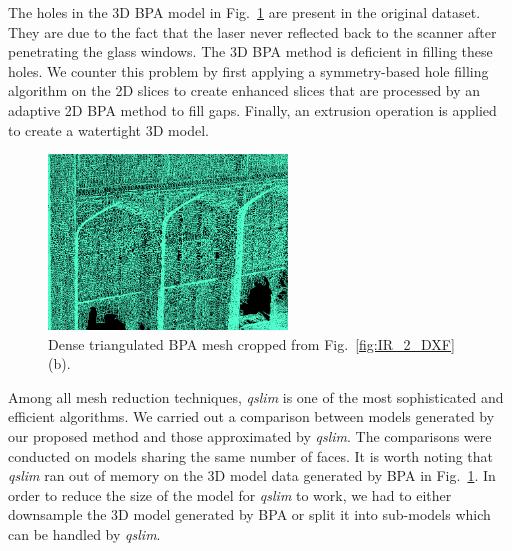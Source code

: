 \documentclass[review]{acmsiggraph}       %
\newcommand{\Fig}[1]{Fig.~\ref{fig:#1}}
\newcommand{\Figb}[1]{Fig.~\ref{fig:#1}(b)}
\begin{document}
The holes in the 3D BPA model in \Fig{TH_BPA} are present in the
original dataset.
They are due to the fact that the laser never reflected back to
the scanner after penetrating the glass windows.
The 3D BPA method is deficient in filling these holes.
We counter this problem by first applying a symmetry-based hole filling
algorithm on the 2D slices to create enhanced slices that are processed
by an adaptive 2D BPA method to fill gaps.
Finally, an extrusion operation is applied to create a watertight 3D model.

\begin{figure}[htbp]
\begin{center}
\includegraphics[width=2.5in]{BPA_TH.png}
\end{center}
\caption{Dense triangulated BPA mesh cropped from \Figb{IR_2_DXF}.}
\label{fig:TH_BPA}
\end{figure}

Among all mesh reduction techniques, {\it qslim} is one of the most
sophisticated and efficient algorithms.
We carried out a comparison between models generated by our proposed
method and those approximated by {\it qslim}.
The comparisons were conducted on models sharing the same number of faces.
It is worth noting that {\it qslim} ran out of memory on the 3D model data
generated by BPA in \Fig{TH_BPA}.
In order to reduce the size of the model for {\it qslim} to work, we had
to either downsample the 3D model generated by BPA or split it into
sub-models which can be handled by {\it qslim}.
\end{document}
